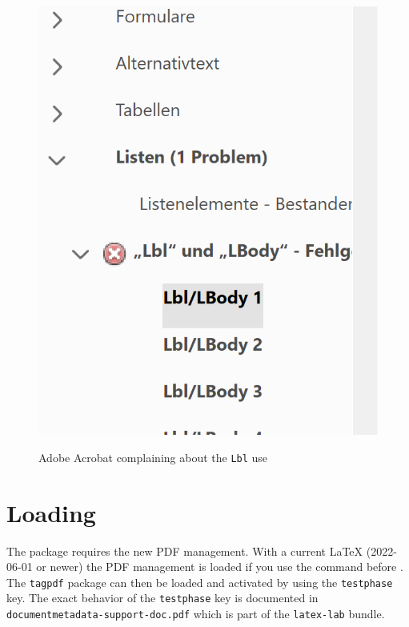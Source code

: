 \documentclass[bibliography=totoc,a4paper]{article}
\newcommand\pkg[1]{\texttt{#1}}
\begin{document}
\begin{figure}

\includegraphics[alt={Screenshot of Adobe report}]{acrobat}

\caption{Adobe Acrobat complaining
about the \texttt{Lbl} use}\label{fig:adobe}\par

\end{figure}


\section{Loading}

The package requires the new PDF management. With a current \LaTeX{} (2022-06-01 or newer)
the PDF management is loaded if you use the  command before .
The \pkg{tagpdf} package can then be loaded and activated by using the \texttt{testphase} key. The exact behavior of
the \texttt{testphase} key is documented in \texttt{documentmetadata-support-doc.pdf} which
is part of the \pkg{latex-lab} bundle.
\end{document}
